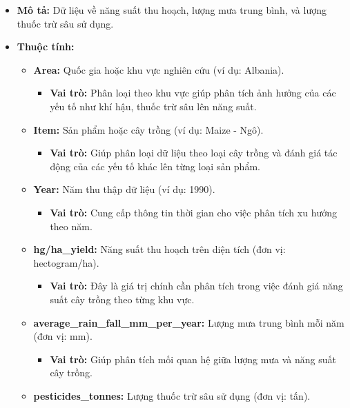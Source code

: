 \begin{description}
    \begin{itemize}
        \item \textbf{Mô tả:} Dữ liệu về năng suất thu hoạch, lượng mưa trung bình, và lượng thuốc trừ sâu sử dụng.
        \item \textbf{Thuộc tính:}
        \begin{itemize}
            \item \textbf{Area:} Quốc gia hoặc khu vực nghiên cứu (ví dụ: Albania).
            \begin{itemize}
                \item \textbf{Vai trò:} Phân loại theo khu vực giúp phân tích ảnh hưởng của các yếu tố như khí hậu, thuốc trừ sâu lên năng suất.
            \end{itemize}
            \item \textbf{Item:} Sản phẩm hoặc cây trồng (ví dụ: Maize - Ngô).
            \begin{itemize}
                \item \textbf{Vai trò:} Giúp phân loại dữ liệu theo loại cây trồng và đánh giá tác động của các yếu tố khác lên từng loại sản phẩm.
            \end{itemize}
            \item \textbf{Year:} Năm thu thập dữ liệu (ví dụ: 1990).
            \begin{itemize}
                \item \textbf{Vai trò:} Cung cấp thông tin thời gian cho việc phân tích xu hướng theo năm.
            \end{itemize}
            \item \textbf{hg/ha\_yield:} Năng suất thu hoạch trên diện tích (đơn vị: hectogram/ha).
            \begin{itemize}
                \item \textbf{Vai trò:} Đây là giá trị chính cần phân tích trong việc đánh giá năng suất cây trồng theo từng khu vực.
            \end{itemize}
            \item \textbf{average\_rain\_fall\_mm\_per\_year:} Lượng mưa trung bình mỗi năm (đơn vị: mm).
            \begin{itemize}
                \item \textbf{Vai trò:} Giúp phân tích mối quan hệ giữa lượng mưa và năng suất cây trồng.
            \end{itemize}
            \item \textbf{pesticides\_tonnes:} Lượng thuốc trừ sâu sử dụng (đơn vị: tấn).

\end{itemize}
\end{itemize}
\end{description}

